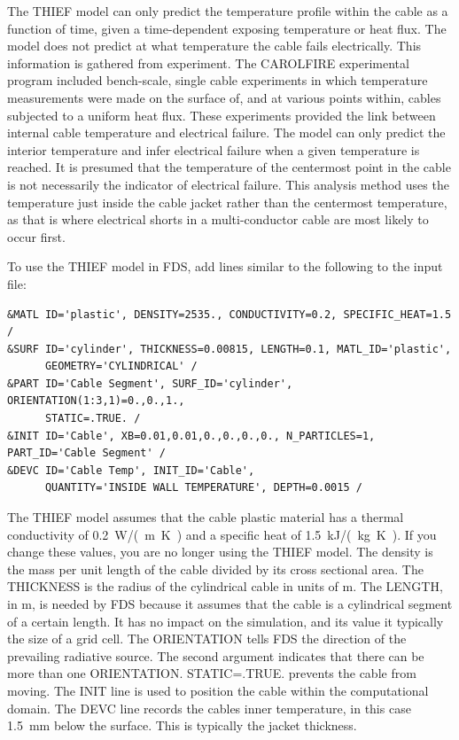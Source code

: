 \documentclass[11pt]{book}
\begin{document}
The THIEF model can only predict the temperature profile within the cable as a function of time, given a time-dependent exposing temperature or heat flux. The model does not predict at what temperature the cable fails electrically. This information is gathered from experiment. The CAROLFIRE experimental program included bench-scale, single cable experiments in which temperature measurements were made on the surface of, and at various points within, cables subjected to a uniform heat flux. These experiments provided the link between internal cable temperature and electrical failure. The model can only predict the interior temperature and infer electrical failure when a given temperature is reached. It is presumed that the temperature of the centermost point in the cable is not necessarily the indicator of electrical failure. This analysis method uses the temperature just inside the cable jacket rather than the centermost temperature, as that is where electrical shorts in a multi-conductor cable are most likely to occur first.

To use the THIEF model in FDS, add lines similar to the following to the input file:
\begin{lstlisting}
&MATL ID='plastic', DENSITY=2535., CONDUCTIVITY=0.2, SPECIFIC_HEAT=1.5 /
&SURF ID='cylinder', THICKNESS=0.00815, LENGTH=0.1, MATL_ID='plastic',
      GEOMETRY='CYLINDRICAL' /
&PART ID='Cable Segment', SURF_ID='cylinder', ORIENTATION(1:3,1)=0.,0.,1.,
      STATIC=.TRUE. /
&INIT ID='Cable', XB=0.01,0.01,0.,0.,0.,0., N_PARTICLES=1, PART_ID='Cable Segment' /
&DEVC ID='Cable Temp', INIT_ID='Cable',
      QUANTITY='INSIDE WALL TEMPERATURE', DEPTH=0.0015 /
\end{lstlisting}
The THIEF model assumes that the cable plastic material has a thermal conductivity of 0.2~\si{W/(m.K)} and a specific heat of 1.5~\si{kJ/(kg.K)}. If you change these values, you are no longer using the THIEF model. The density is the mass per unit length of the cable divided by its cross sectional area. The {\ct THICKNESS} is the radius of the cylindrical cable in units of m. The {\ct LENGTH}, in m, is needed by FDS because it assumes that the cable is a cylindrical segment of a certain length. It has no impact on the simulation, and its value it typically the size of a grid cell. The {\ct ORIENTATION} tells FDS the direction of the prevailing radiative source. The second argument indicates that there can be more than one {\ct ORIENTATION}. {\ct STATIC=.TRUE.} prevents the cable from moving. The {\ct INIT} line is used to position the cable within the computational domain. The {\ct DEVC} line records the cables inner temperature, in this case 1.5~mm below the surface. This is typically the jacket thickness.
\end{document}
